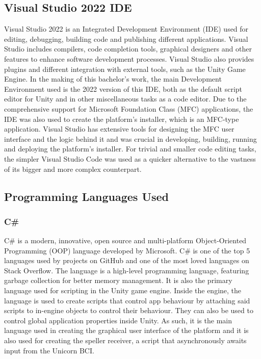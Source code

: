 \subsection{Visual Studio 2022 IDE}
Visual Studio 2022 is an Integrated Development Environment (IDE) used for editing, debugging, building code and publishing different applications. Visual Studio includes compilers, code completion tools, graphical designers and other features to enhance software development processes\cite{VisualStudio}. Visual Studio also provides plugins and different integration with external tools, such as the Unity Game Engine. In the making of this bachelor's work, the main Development Environment used is the 2022 version of this IDE, both as the default script editor for Unity and in other miscellaneous tasks as a code editor.
\vspace{\baselineskip}\newline
Due to the comprehensive support for Microsoft Foundation Class (MFC) applications, the IDE was also used to create the platform's installer, which is an MFC-type application. Visual Studio has extensive tools for designing the MFC user interface and the logic behind it and was crucial in developing, building, running and deploying the platform's installer.
\vspace{\baselineskip}\newline
For trivial and smaller code editing tasks, the simpler Visual Studio Code was used as a quicker alternative to the vastness of its bigger and more complex counterpart.
\vspace{\baselineskip}\newline


\subsection{Programming Languages Used}
\subsubsection{C\#}
C\# is a modern, innovative, open source and multi-platform Object-Oriented Programming (OOP) language\cite{C_sharp} developed by Microsoft. C\# is one of the top 5 languages used by projects on GitHub and one of the most loved languages on Stack Overflow\cite{StackOverflow_language_survey}. The language is a high-level programming language, featuring garbage collection for better memory management. It is also the primary language used for scripting in the Unity game engine. Inside the engine, the language is used to create scripts that control app behaviour by attaching said scripts to in-engine objects to control their behaviour. They can also be used to control global application properties inside Unity. As such, it is the main language used in creating the graphical user interface of the platform and it is also used for creating the speller receiver, a script that asynchronously awaits input from the Unicorn BCI.

